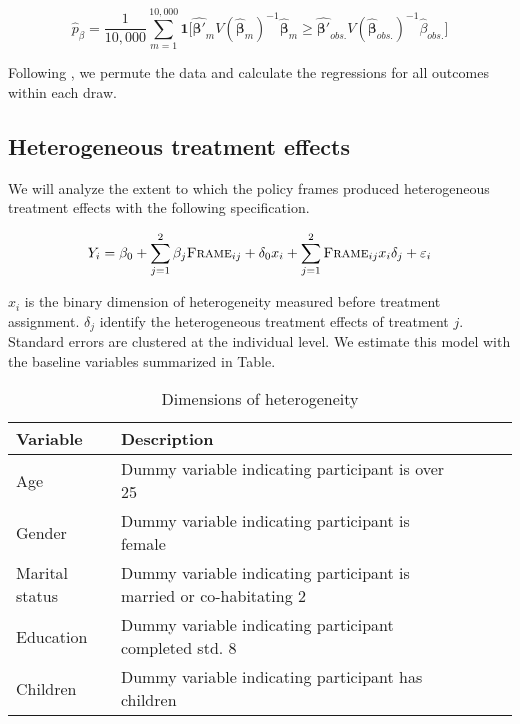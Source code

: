 \documentclass[11pt, a4paper]{article}\usepackage[]{graphicx}\usepackage[]{color}
\begin{document}
        \begin{equation} \label{eq:exactp}
            \hat{p}_{\beta} =  \frac{1}{10,000}\sum_{m=1}^{10,000} \mathbf{1} \Big [ \mathbf{\hat{\beta'}}_m V(\mathbf{\hat{\beta}}_m)^{-1} \mathbf{\hat{\beta}}_m \geq \mathbf{\hat{\beta'}}_{obs.} V(\mathbf{\hat{\beta}}_{obs.})^{-1} \hat{\beta}_{obs.} \Big ]
        \end{equation}

        Following \textcite{young_channeling_2015}, we permute the data and calculate the regressions for all outcomes within each draw.

    \subsection{Heterogeneous treatment effects}

        We will analyze the extent to which the policy frames produced heterogeneous treatment effects with the following specification.

        \begin{equation}
        Y_{i} = \beta_{0} + \sum_{j=1}^{2} \beta_{j}\text{\textsc{Frame}}_{ij} + \delta_{0}x_{i} + \sum_{j=1}^{2} \text{\textsc{Frame}}_{ij} x_{i} \delta_{j} + \varepsilon_{i}
        \label{eq:heteffect} \end{equation}

        $x_{i}$ is the binary dimension of heterogeneity measured before treatment assignment. $\delta_{j}$ identify the heterogeneous treatment effects of treatment $j$. Standard errors are clustered at the individual level. We estimate this model with the baseline variables summarized in Table.

        \begin{table}[h]
        \centering
        \caption{Dimensions of heterogeneity}
        \label{tab:hetvars}
        \begin{tabular}{@{}lllll@{}}
        \toprule
        Variable                                     & Description                                          &  &  &  \\ \midrule
        Age & Dummy variable indicating participant is over 25 &  &  &  \\
        Gender & Dummy variable indicating participant is female &  &  &  \\
        Marital status & Dummy variable indicating participant is married or co-habitating 2 &  &  &  \\
        Education & Dummy variable indicating participant completed std. 8 &  &  &  \\
        Children & Dummy variable indicating participant has children &  &  &  \\ \bottomrule
        \end{tabular}
        \end{table}
\end{document}
